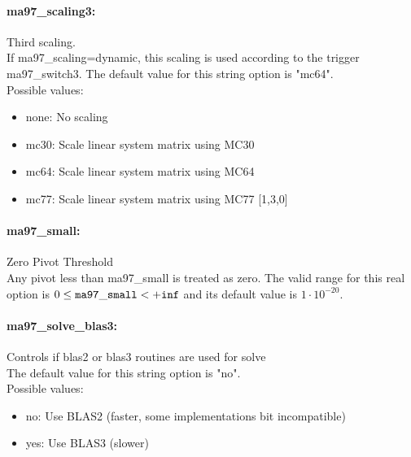 \paragraph{ma97\_scaling3:}\label{opt:ma97_scaling3} Third scaling. \\
 If ma97\_scaling=dynamic, this scaling is used according to the trigger ma97\_switch3. The default value for this string option is "mc64".
\\ 
Possible values:
\begin{itemize}
   \item none: No scaling
   \item mc30: Scale linear system matrix using MC30
   \item mc64: Scale linear system matrix using MC64
   \item mc77: Scale linear system matrix using MC77 [1,3,0]
\end{itemize}

\paragraph{ma97\_small:}\label{opt:ma97_small} Zero Pivot Threshold \\
 Any pivot less than ma97\_small is treated as zero. The valid range for this real option is 
$0 \le {\tt ma97\_small } <  {\tt +inf}$
and its default value is $1 \cdot 10^{-20}$.


\paragraph{ma97\_solve\_blas3:}\label{opt:ma97_solve_blas3} Controls if blas2 or blas3 routines are used for solve \\
 The default value for this string option is "no".
\\ 
Possible values:
\begin{itemize}
   \item no: Use BLAS2 (faster, some implementations bit incompatible)
   \item yes: Use BLAS3 (slower)
\end{itemize}

